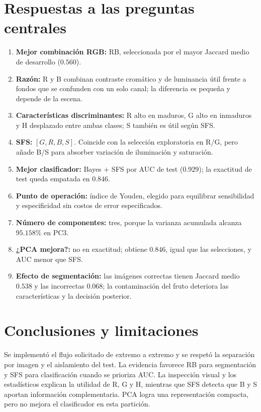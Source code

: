 \documentclass[11pt,a4paper]{article}
\begin{document}
\section{Respuestas a las preguntas centrales}

\begin{enumerate}[leftmargin=1.7em]
    \item \textbf{Mejor combinación RGB:} RB, seleccionada por el mayor Jaccard medio
    de desarrollo ($0.560$).
    \item \textbf{Razón:} R y B combinan contraste cromático y de luminancia útil
    frente a fondos que se confunden con un solo canal; la diferencia es pequeña y
    depende de la escena.
    \item \textbf{Características discriminantes:} R alto en maduros, G alto en
    inmaduros y H desplazado entre ambas clases; S también es útil según SFS.
    \item \textbf{SFS:} $[G,R,B,S]$. Coincide con la selección exploratoria en R/G,
    pero añade B/S para absorber variación de iluminación y saturación.
    \item \textbf{Mejor clasificador:} Bayes + SFS por AUC de test ($0.929$); la
    exactitud de test queda empatada en $0.846$.
    \item \textbf{Punto de operación:} índice de Youden, elegido para equilibrar
    sensibilidad y especificidad sin costos de error especificados.
    \item \textbf{Número de componentes:} tres, porque la varianza acumulada alcanza
    $95.158\%$ en PC3.
    \item \textbf{¿PCA mejora?:} no en exactitud; obtiene $0.846$, igual que las
    selecciones, y AUC menor que SFS.
    \item \textbf{Efecto de segmentación:} las imágenes correctas tienen Jaccard
    medio $0.538$ y las incorrectas $0.068$; la contaminación del fruto deteriora
    las características y la decisión posterior.
\end{enumerate}

\section{Conclusiones y limitaciones}

Se implementó el flujo solicitado de extremo a extremo y se respetó la separación
por imagen y el aislamiento del test. La evidencia favorece RB para segmentación y
SFS para clasificación cuando se prioriza AUC. La inspección visual y los
estadísticos explican la utilidad de R, G y H, mientras que SFS detecta que B y S
aportan información complementaria. PCA logra una representación compacta, pero no
mejora el clasificador en esta partición.
\end{document}
